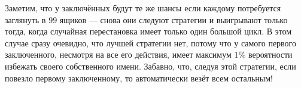 Заметим, что у заключённых будут те же шансы если каждому потребуется заглянуть в $99$ ящиков --- снова они следуют стратегии и выигрывают только тогда, когда случайная перестановка имеет только один большой цикл.
В этом случае сразу очевидно, что лучшей стратегии нет, потому что у самого первого заключенного, несмотря на все его действия, имеет максимум $1\%$ вероятности избежать своего собственного имени.
Забавно, что, следуя этой стратегии, если повезло первому заключенному, то автоматически везёт всем остальным!
